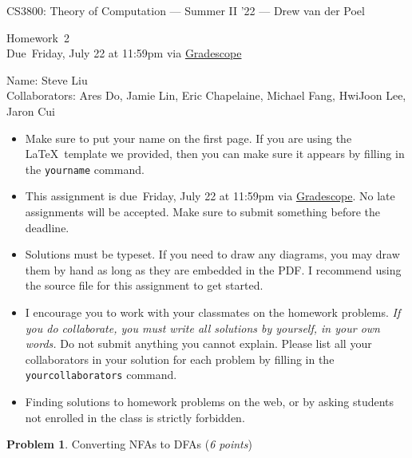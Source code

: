 \documentclass[11pt]{article}
\newcommand{\yourname}{}
\newcommand{\yourcollaborators}{}
\theoremstyle{definition}
\newcommand{\instructor}{Drew van der Poel}
\newcommand{\hwnum}{2}
\newcommand{\hwdue}{Friday, July 22 at 11:59pm via \href{https://www.gradescope.com/courses/406943}{Gradescope}}
\theoremstyle{theorem}
\newtheorem{prob}{Problem}
\begin{document}
{\Large 
\begin{center}{CS3800: Theory of Computation} --- Summer II '22 --- \instructor \end{center}}
{\large
\vspace{10pt}
\noindent Homework~\hwnum \vspace{2pt}\\
Due~\hwdue}

\bigskip
{\large
\noindent Name: Steve Liu  \yourname \vspace{2pt}\\ Collaborators: Ares Do, Jamie Lin, Eric Chapelaine, Michael Fang, HwiJoon Lee, Jaron Cui \yourcollaborators}

\vspace{15pt}
\begin{itemize}

\item Make sure to put your name on the first page.  If you are using the \LaTeX~template we provided, then you can make sure it appears by filling in the \texttt{yourname} command.

\item This assignment is due~\hwdue.  No late assignments will be accepted.  Make sure to submit something before the deadline.

\item Solutions must be typeset.  If you need to draw any diagrams, you may draw them by hand as long as they are embedded in the PDF.  I recommend using the source file for this assignment to get started.

\item I encourage you to work with your classmates on the homework problems. \emph{If you do collaborate, you must write all solutions by yourself, in your own words.}  Do not submit anything you cannot explain.  Please list all your collaborators in your solution for each problem by filling in the \texttt{yourcollaborators} command.

\item Finding solutions to homework problems on the web, or by asking students not enrolled in the class is strictly forbidden.

\end{itemize}





\newpage

\begin{prob} Converting NFAs to DFAs (\emph{6 points})\end{prob}
\end{document}
